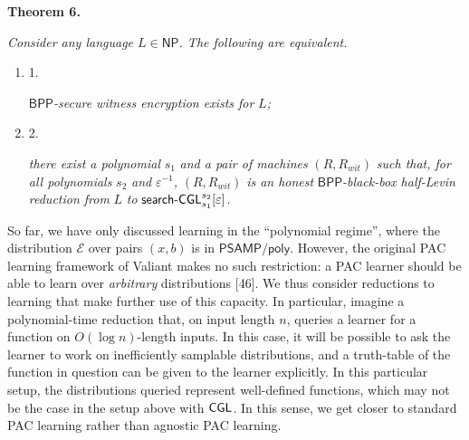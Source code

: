 

\par\medskip\noindent\textbf{
\textbf{Theorem 6}\textbf{.}
}\par



\emph{Consider any language $L\in{\mathsf{NP}}$. The following are equivalent.}\par


\begin{enumerate}


\item[] 
1. 


${\mathsf{BPP}}$\emph{-secure witness encryption exists for }$L$\emph{;}\par





\item[] 
2. 


\emph{there exist a polynomial }$s_{1}$\emph{ and a pair of machines }$(R,R_{wit})$\emph{ such that, for all polynomials }$s_{2}$\emph{ and }$\varepsilon^{-1}$\emph{, }$(R,R_{wit})$\emph{ is an honest }${\mathsf{BPP}}$\emph{-black-box half-Levin reduction from }$L$\emph{ to }${\sf search}\text{-}{\sf CGL}^{s_{2}}_{s_{1}}[\varepsilon]$\emph{.}\par





\end{enumerate}






So far, we have only discussed learning in the “polynomial regime”, where the distribution $\mathcal{E}$ over pairs $(x,b)$ is in ${\mathsf{P}}{\mathsf{SAMP}}/{\mathsf{poly}}$. However, the original PAC learning framework of Valiant makes no such restriction: a PAC learner should be able to learn over \emph{arbitrary} distributions [46]. We thus consider reductions to learning that make further use of this capacity. In particular, imagine a polynomial-time reduction that, on input length $n$, queries a learner for a function on $O(\log n)$-length inputs. In this case, it will be possible to ask the learner to work on inefficiently samplable distributions, and a truth-table of the function in question can be given to the learner explicitly. In this particular setup, the distributions queried represent well-defined functions, which may not be the case in the setup above with ${\sf CGL}$. In this sense, we get closer to standard PAC learning rather than agnostic PAC learning.\par




